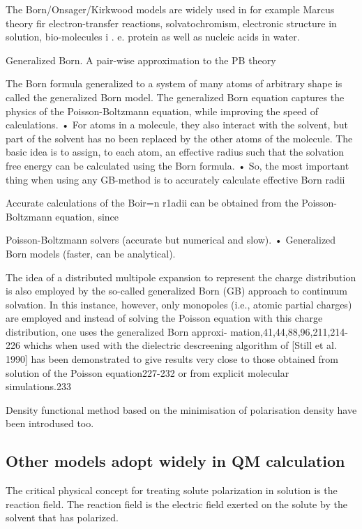 The Born/Onsager/Kirkwood models are widely used in for example Marcus
theory fir electron-transfer reactions, solvatochromism, electronic
structure in solution, bio-molecules i . e. protein as well as nucleic
acids in water. \citep{hirata_molecular_2004}

Generalized Born. A pair-wise approximation to the PB theory

The Born formula generalized to a system of many atoms of arbitrary
shape is called the generalized Born model. The generalized Born equation
captures the physics of the Poisson-Boltzmann equation, while improving
the speed of calculations. • For atoms in a molecule, they also interact
with the solvent, but part of the solvent has no been replaced by
the other atoms of the molecule. The basic idea is to assign, to each
atom, an effective radius such that the solvation free energy can
be calculated using the Born formula. • So, the most important thing
when using any GB-method is to accurately calculate effective Born
radii

Accurate calculations of the Boir=n r1adii can be obtained from the
Poisson- Boltzmann equation, since

Poisson-Boltzmann solvers (accurate but numerical and slow). • Generalized
Born models (faster, can be analytical). 

The idea of a distributed multipole expansion to represent the charge
distribution is also employed by the so-called generalized Born (GB)
approach to continuum solvation. In this instance, however, only monopoles
(i.e., atomic partial charges) are employed and instead of solving
the Poisson equation with this charge distribution, one uses the generalized
Born approxi- mation,41,44,88,96,211,214-226 whichs when used with
the dielectric descreening algorithm of {[}Still et al. 1990{]} has
been demonstrated to give results very close to those obtained from
solution of the Poisson equation227-232 or from explicit molecular
simulations.233 

Density functional method based on the minimisation of polarisation
density have been introdused too. \citep{Marchi_2001}


\subsection{Other models adopt widely in QM calculation}

The critical physical concept for treating solute polarization in
solution is the reaction field. The reaction field is the electric
field exerted on the solute by the solvent that has polarized.


